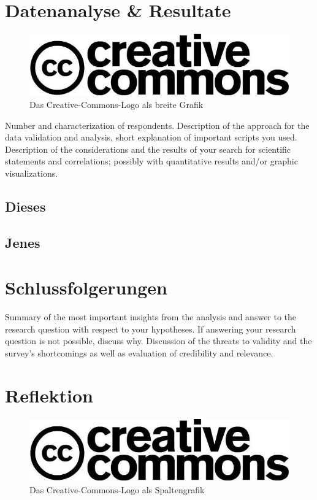 \documentclass[de]{agse-empir-report}\usepackage[]{graphicx}\usepackage[]{color}
\begin{document}
\section[pb]{Datenanalyse \& Resultate}

\begin{figure}
    \includegraphics[width=\linewidth]{creative_commons.jpg}
    \caption{Das Creative-Commons-Logo als breite Grafik}
\end{figure}

Number and characterization of respondents.
Description of the approach for the data validation and
analysis, short explanation of important scripts you used.
Description of the considerations and the results of your search for
scientific statements and correlations; possibly with quantitative
results and/or graphic visualizations.

\lipsum[5]


\subsection{Dieses}
\lipsum[6]


\subsection[mds]{Jenes}
\lipsum[7-8]


\section[hs]{Schlussfolgerungen}
Summary of the most important insights from the analysis and
answer to the research question with respect to your hypotheses.
If answering your research question is not possible, discuss why.
Discussion of the threats to validity and the survey's
shortcomings as well as evaluation of credibility and relevance.

\lipsum[9-10]


\section[kk]{Reflektion}

\begin{figure}
    \includegraphics[width=\linewidth]{creative_commons.jpg}
    \caption{Das Creative-Commons-Logo als Spaltengrafik}
\end{figure}
\end{document}
